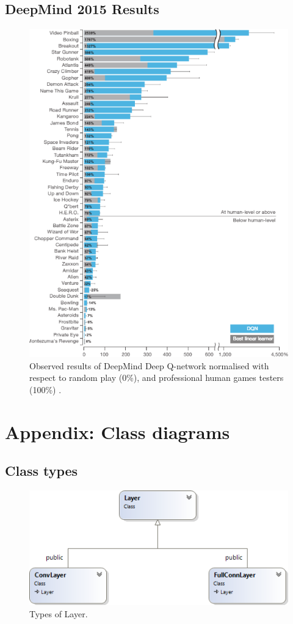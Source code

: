 \documentclass[10pt]{article}
\begin{document}
\subsection{DeepMind 2015 Results}
		\begin{figure}[h]
    		\centering
			\includegraphics[scale=0.7]{img/dmResults}
			\caption{Observed results of DeepMind Deep Q-network normalised with respect to random play (0\%), and professional human games testers (100\%) \cite{humanlevel}.}
			\label{fig:2015results}
		\end{figure}
\newpage
\section{Appendix: Class diagrams}
	\subsection{Class types}
		\begin{figure}[h]
			\centering
			\includegraphics[scale=1]{img/typesOfLayers}
			\caption{Types of Layer.}
			\label{fig:layertypes}	
		\end{figure}
		
\end{document}
